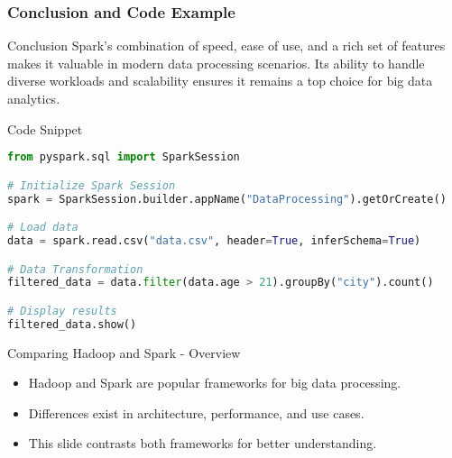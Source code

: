 \documentclass[aspectratio=169]{beamer}
\begin{document}
\begin{frame}[fragile]
    \frametitle{Conclusion and Code Example}
    \begin{block}{Conclusion}
        Spark's combination of speed, ease of use, and a rich set of features makes it valuable in modern data processing scenarios. Its ability to handle diverse workloads and scalability ensures it remains a top choice for big data analytics.
    \end{block}
    
    \begin{block}{Code Snippet}
        \begin{lstlisting}[language=Python]
from pyspark.sql import SparkSession

# Initialize Spark Session
spark = SparkSession.builder.appName("DataProcessing").getOrCreate()

# Load data
data = spark.read.csv("data.csv", header=True, inferSchema=True)

# Data Transformation
filtered_data = data.filter(data.age > 21).groupBy("city").count()

# Display results
filtered_data.show()
        \end{lstlisting}
    \end{block}
\end{frame}

\begin{frame}[fragile]{Comparing Hadoop and Spark - Overview}
    \begin{itemize}
        \item Hadoop and Spark are popular frameworks for big data processing.
        \item Differences exist in architecture, performance, and use cases.
        \item This slide contrasts both frameworks for better understanding.
    \end{itemize}
\end{frame}
\end{document}
